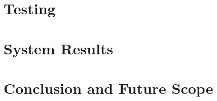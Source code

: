 \documentclass[12pt,a4paper]{article}
\begin{document}

\section{Testing}


\section{System Results}


\section{Conclusion and Future Scope}


\newpage


\end{document}
